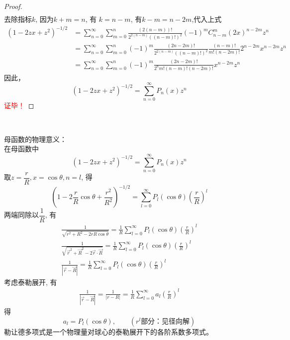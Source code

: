 \begin{proof}
\begin{equation*}
\begin{split}
		\end{split}
		\end{equation*}
		去除指标$k$, 因为$k+m=n$, 有 $k=n-m$, 有$k-m = n-2m $,代入上式
		\begin{equation*}
			\begin{split}
			\left(1-2 z x+z^{2}\right)^{-{1}/{2}}&=\sum_{n=0}^{\infty}\sum_{m=0}^{n} \frac{(2 (n-m)) !}{2^{2 (n-m)}((n-m) !)^{2}}(-1)^{m} C_{n-m}^{m}(2 x)^{n-2m} z^{n}\\
			&=\sum_{n=0}^{\infty}\sum_{m=0}^{n}(-1)^{m} \frac{(2 n-2m) !}{2^{2 (n-m)}((n-m) !)^{2}} \frac{(n-m) !}{m!(n-2 m) !}2^{n-2 m}x^{n-2 m} z^{n}\\
			&=\sum_{n=0}^{\infty}\sum_{m=0}^{n}(-1)^{m} \frac{(2 n-2 m) !}{2^{n} m !(n-m) !(n-2 m) !} x^{n-2 m} z^{n}
		\end{split}
		\end{equation*}	
		因此，
		$$
		\left(1-2 z x+z^{2}\right)^{-{1}/{2}}=\sum_{n=0}^{\infty}P_{n}(x) z^{n}  
		$$ 
	\textcolor{red}{证毕！}
	\end{proof}
	
	~~\\ 
	\begin{hint}
		母函数的物理意义： \\
		在母函数中
		$$
		\left(1-2 z x+z^{2}\right)^{-{1}/{2}}=\sum_{n=0}^{\infty}P_{n}(x) z^{n}  
		$$
		取$z=\dfrac{r}{R}, x = \cos \theta, n=l $, 得
		$$
		\left(1-2 \frac{r}{R} \cos \theta+\frac{r^2}{R^2}\right)^{-{1}/{2}}=\sum_{l=0}^{\infty}P_{l}(\cos \theta) (\frac{r}{R})^{l}  
		$$
		两端同除以$\dfrac{1}{R}$, 有
		\[\begin{aligned}
			\frac{1}{\sqrt{r^2+ R^2 -2rR\cos \theta} } =\frac{1}{R} \sum_{l=0}^{\infty}P_{l}(\cos \theta) (\frac{r}{R})^{l}  \\ 
			\frac{1}{\sqrt{\vec{r}^2+ \vec{R}^2 -2\vec{r}\cdot\vec{R} }} =\frac{1}{R} \sum_{l=0}^{\infty}P_{l}(\cos \theta) (\frac{r}{R})^{l}  \\
			\frac{1}{\left\vert\vec{r}-\vec{R} \right\vert} =\frac{1}{R} \sum_{l=0}^{\infty}P_{l}(\cos \theta) (\frac{r}{R})^{l} 
		\end{aligned} \]
		考虑泰勒展开, 有
		\[\begin{aligned}
			\frac{1}{\left\vert\vec{r}-\vec{R} \right\vert} = \frac{1}{\left\vert r- R \right\vert} = \frac{1}{R} \sum_{l=0}^{\infty}a_l(\frac{r}{R})^{l} 
		\end{aligned} \]
		得
		\[ a_l = P_l(\cos \theta), \qquad (r^l\text{部分：见径向解} )\]
		勒让德多项式是一个物理量对球心的泰勒展开下的各阶系数多项式。
	\end{hint}
	
